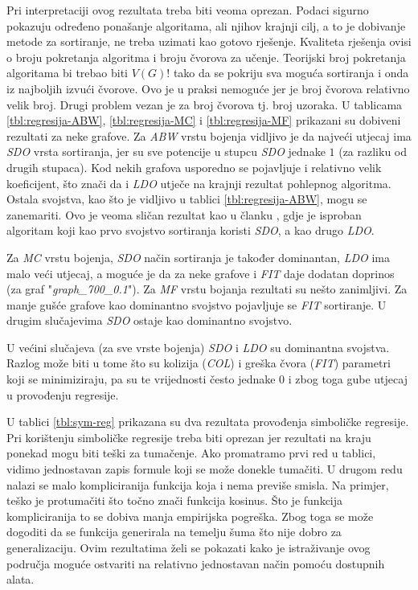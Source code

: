 \documentclass[times, utf8, diplomski, numeric]{fer}
\begin{document}
Pri interpretaciji ovog rezultata treba biti veoma oprezan. Podaci sigurno pokazuju određeno ponašanje algoritama, ali njihov krajnji cilj, a to je dobivanje metode za sortiranje, ne treba uzimati kao gotovo rješenje. Kvaliteta rješenja ovisi o broju pokretanja algoritma i broju čvorova za učenje. Teorijski broj pokretanja algoritama bi trebao biti $V(G)!$ tako da se pokriju sva moguća sortiranja i onda iz najboljih izvući čvorove. Ovo je u praksi nemoguće jer je broj čvorova relativno velik broj. Drugi problem vezan je za broj čvorova tj. broj uzoraka. U tablicama \ref{tbl:regresija-ABW}, \ref{tbl:regresija-MC} i \ref{tbl:regresija-MF} prikazani su dobiveni rezultati za neke grafove. Za \emph{ABW} vrstu bojenja vidljivo je da najveći utjecaj ima \emph{SDO} vrsta sortiranja, jer su sve potencije u stupcu \emph{SDO} jednake $1$ (za razliku od drugih stupaca). Kod nekih grafova usporedno se pojavljuje i relativno velik koeficijent, što znači da i \emph{LDO} utječe na krajnji rezultat pohlepnog algoritma. Ostala svojstva, kao što je vidljivo u tablici \ref{tbl:regresija-ABW}, mogu se zanemariti. Ovo je veoma sličan rezultat kao u članku \cite{lit7}, gdje je isproban algoritam koji kao prvo svojstvo sortiranja koristi \emph{SDO}, a kao drugo \emph{LDO}.

Za \emph{MC} vrstu bojenja, \emph{SDO} način sortiranja je također dominantan, \emph{LDO} ima malo veći utjecaj, a moguće je da za neke grafove i \emph{FIT} daje dodatan doprinos (za graf "\emph{graph\_700\_0.1}"). Za \emph{MF} vrstu bojanja rezultati su nešto zanimljivi. Za manje gušće grafove kao dominantno svojstvo pojavljuje se \emph{FIT} sortiranje. U drugim slučajevima \emph{SDO} ostaje kao dominantno svojstvo.

U većini slučajeva (za sve vrste bojenja) \emph{SDO} i \emph{LDO} su dominantna svojstva. Razlog može biti u tome što su kolizija (\emph{COL}) i greška čvora (\emph{FIT}) parametri koji se minimiziraju, pa su te vrijednosti često jednake $0$ i zbog toga gube utjecaj u provođenju regresije.

U tablici \ref{tbl:sym-reg} prikazana su dva rezultata provođenja simboličke regresije. Pri korištenju simboličke regresije treba biti oprezan jer rezultati na kraju ponekad mogu biti teški za tumačenje. Ako promatramo prvi red u tablici, vidimo jednostavan zapis formule koji se može donekle tumačiti. U drugom redu nalazi se malo kompliciranija funkcija koja i nema previše smisla. Na primjer, teško je protumačiti što točno znači funkcija kosinus. Što je funkcija kompliciranija to se dobiva manja empirijska pogreška. Zbog toga se može dogoditi da se funkcija generirala na temelju šuma što nije dobro za generalizaciju. Ovim rezultatima želi se pokazati kako je istraživanje ovog područja moguće ostvariti na relativno jednostavan način pomoću dostupnih alata.
\end{document}
